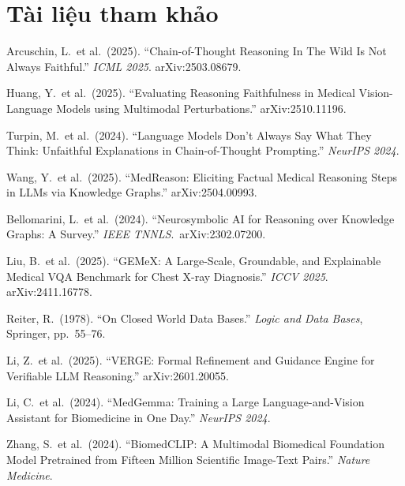 \documentclass[11pt,a4paper]{article}
\begin{document}
\section*{Tài liệu tham khảo}

\begin{enumerate}[leftmargin=1.5em, label={[\arabic*]}]
  \item Arcuschin, L.\ et al.\ (2025). ``Chain-of-Thought Reasoning In The Wild Is Not Always Faithful.'' \textit{ICML 2025}. arXiv:2503.08679.

  \item Huang, Y.\ et al.\ (2025). ``Evaluating Reasoning Faithfulness in Medical Vision-Language Models using Multimodal Perturbations.'' arXiv:2510.11196.

  \item Turpin, M.\ et al.\ (2024). ``Language Models Don't Always Say What They Think: Unfaithful Explanations in Chain-of-Thought Prompting.'' \textit{NeurIPS 2024}.

  \item Wang, Y.\ et al.\ (2025). ``MedReason: Eliciting Factual Medical Reasoning Steps in LLMs via Knowledge Graphs.'' arXiv:2504.00993.

  \item Bellomarini, L.\ et al.\ (2024). ``Neurosymbolic AI for Reasoning over Knowledge Graphs: A Survey.'' \textit{IEEE TNNLS}.\ arXiv:2302.07200.

  \item Liu, B.\ et al.\ (2025). ``GEMeX: A Large-Scale, Groundable, and Explainable Medical VQA Benchmark for Chest X-ray Diagnosis.'' \textit{ICCV 2025}. arXiv:2411.16778.

  \item Reiter, R.\ (1978). ``On Closed World Data Bases.'' \textit{Logic and Data Bases}, Springer, pp.\ 55--76.

  \item Li, Z.\ et al.\ (2025). ``VERGE: Formal Refinement and Guidance Engine for Verifiable LLM Reasoning.'' arXiv:2601.20055.

  \item Li, C.\ et al.\ (2024). ``MedGemma: Training a Large Language-and-Vision Assistant for Biomedicine in One Day.'' \textit{NeurIPS 2024}.

  \item Zhang, S.\ et al.\ (2024). ``BiomedCLIP: A Multimodal Biomedical Foundation Model Pretrained from Fifteen Million Scientific Image-Text Pairs.'' \textit{Nature Medicine}.


\end{enumerate}
\end{document}
